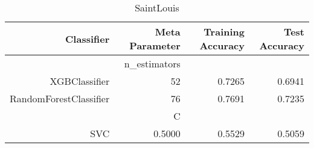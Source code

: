 
\begin{table}[H]
    \caption{SaintLouis}
    \centering
    \begin{tabular}{|r|r|r|r|}
        \hline
        Classifier &Meta Parameter &Training Accuracy
        &Test Accuracy\\
        \hline
        &n\_estimators &\multicolumn{2}{|r|}{}\\
        \hline
        XGBClassifier &52 &0.7265 &0.6941\\
        \hline
        RandomForestClassifier &76 &0.7691 &0.7235\\
        \hline
        &C &\multicolumn{2}{|r|}{}\\
        \hline
        SVC &0.5000 &0.5529 &0.5059\\
        \hline
    \end{tabular}
\end{table}
